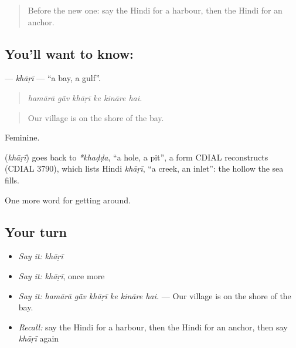 \label{lesson:HI-C444-khari}



\begin{quote}
Before the new one: say the Hindi for a harbour, then the Hindi for an anchor.
\end{quote}

\subsection*{You'll want to know: }
\textbf{} — \emph{khāṛī} — \textquotedblleft{}a bay, a gulf\textquotedblright{}.

\begin{quote}
     
\end{quote}

\begin{quote}
\emph{hamārā gā̃v khāṛī ke kināre hai.}
\end{quote}

\begin{quote}
Our village is on the shore of the bay.
\end{quote}

Feminine.

\begin{cousinweb}
\textbf{} (\emph{khāṛī}) goes back to \emph{*khaḍḍa}, \textquotedblleft{}a hole, a pit\textquotedblright{}, a form CDIAL reconstructs (CDIAL 3790), which lists Hindi \emph{khāṛī}, \textquotedblleft{}a creek, an inlet\textquotedblright{}: the hollow the sea fills.
\end{cousinweb}

\begin{grammarlens}[title={What you've built}]
One more word for getting around.
\end{grammarlens}

\subsection*{Your turn}
\begin{itemize}
\raggedright
  \item \emph{Say it:} \emph{khāṛī}
  \item \emph{Say it:} \emph{khāṛī}, once more
  \item \emph{Say it:} \emph{hamārā gā̃v khāṛī ke kināre hai.} — Our village is on the shore of the bay.
  \item \emph{Recall:} say the Hindi for a harbour, then the Hindi for an anchor, then say \emph{khāṛī} again
\end{itemize}

